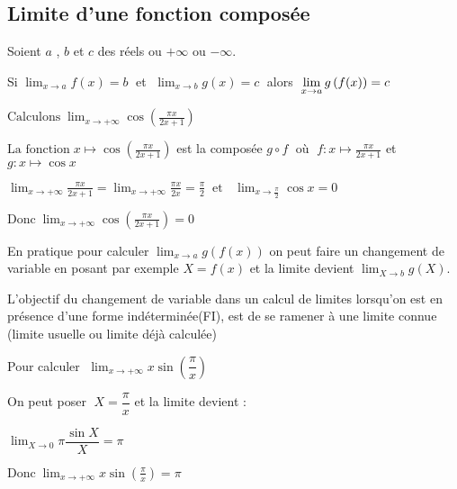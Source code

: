 
\everymath{\displaystyle}

 \summary{}
     
    \subsection{Limite d'une fonction composée}
      Soient $a$ , $b$
        et  $c$ des réels ou  $+\infty $ ou $-\infty $.
        
   \medskip
\begin{property}
Si  $ \displaystyle\lim_{x \to a}f(x)=b \;$ et $\;   \displaystyle\lim_{x \to b}g(x)=c \;$ alors $ \;   \displaystyle\lim_{x \to a}g\left(f(x)\right)=c $\\
\end{property}

 \medskip
       \begin{example}
      $\text{Calculons}\; \displaystyle\lim_{x \to +\infty} \cos\left(\frac{\pi x}{2x+1}\right)$
      
       $ \text{La fonction} \; x \mapsto \cos\left(\frac{\pi x}{2x+1}\right)$ est la composée $ g\circ f\; $  où $\; f: x\mapsto\frac{\pi x}{2x+1}$  et $g: x \mapsto \cos x $
       
        $\displaystyle\lim_{x \to +\infty} \frac{\pi x}{2x+1}= \displaystyle\lim_{x \to +\infty} \frac{\pi x}{2x }=\frac{\pi }{2} \;\; \text{et }\;\; \displaystyle\lim_{x \to \frac{\pi }{2}} \cos x=0$
        
      $\text{Donc}\; \displaystyle\lim_{x \to +\infty} \cos\left(\frac{\pi x}{2x+1}\right)=0$
   \end{example}
     \begin{remark}
       En pratique pour calculer $\displaystyle\lim_{x \to a}g\left(f(x)\right) $ on peut faire  un changement de variable en posant par exemple   $X=f(x) $  et la limite devient  $\displaystyle\lim_{X \to b}g(X)$.
       
      L’objectif du changement de variable dans un calcul de limites lorsqu’on est en présence d’une forme indéterminée(FI), est de se ramener à une limite connue (limite usuelle ou limite déjà calculée)
     \end{remark}
\begin{example}
Pour calculer $\;\displaystyle \lim_{x \to +\infty} x\sin \left(\dfrac{\pi}{x}\right)$
 
     On peut poser $ \; X=\dfrac{\pi }{x}$  et la limite devient :
      
      $\displaystyle\lim_{X\to 0} \pi\dfrac{\sin X }{X}=\pi $
      
       $\text{Donc}\; \displaystyle\lim_{x \to +\infty} x\sin \left(\frac{\pi}{x}\right)=\pi$
   \end{example}
